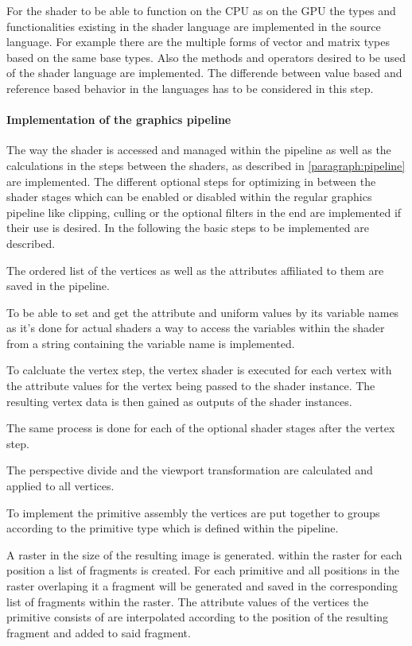 For the shader to be able to function on the CPU as on the GPU the types and functionalities existing in the shader language are implemented in the source language. For example there are the multiple forms of vector and matrix types based on the same base types. Also the methods and operators desired to be used of the shader language are implemented. The differende between value based and reference based behavior in the languages has to be considered in this step.

\paragraph{Implementation of the graphics pipeline}

The way the shader is accessed and managed within the pipeline  as well as the calculations in the steps between the shaders, as described in \autoref{paragraph:pipeline} are implemented. The different optional steps for optimizing in between the shader stages which can be enabled or disabled within the regular graphics pipeline like clipping, culling or the optional filters in the end are implemented if their use is desired. In the following the basic steps to be implemented are described.

The ordered list of the vertices as well as the attributes affiliated to them are saved in the pipeline.

To be able to set and get the attribute and uniform values by its variable names as it's done for actual shaders  a way to access the variables within the shader from a string containing the variable name is implemented.

To calcluate the vertex step, the vertex shader is executed for each vertex with the attribute values for the vertex being passed to the shader instance. The resulting vertex data is then gained as outputs of the shader instances.

The same process is done for each of the optional shader stages after the vertex step.

The perspective divide and the viewport transformation are calculated and applied to all vertices.

To implement the primitive assembly the vertices are put together to groups according to the primitive type which is defined within the pipeline.

A raster in the size of the resulting image is generated. within the raster for each position a list of fragments is created. For each primitive and all positions in the raster overlaping it a fragment will be generated and saved in the corresponding list of fragments within the raster. The attribute values of the vertices the primitive consists of are interpolated according to the position of the resulting fragment and added to said fragment.

